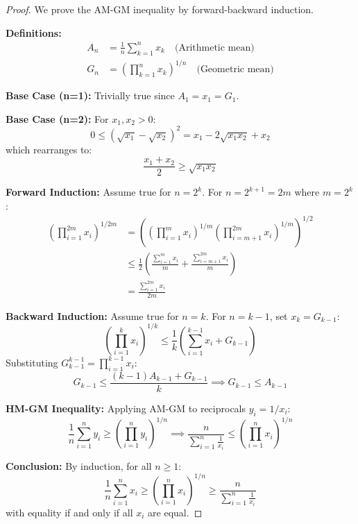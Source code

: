 \documentclass[12pt]{article}
\begin{document}
\begin{proof}
We prove the AM-GM inequality by forward-backward induction.

\vspace{0.5em}

\noindent \textbf{Definitions:}
\begin{align*}
A_n &= \frac{1}{n}\sum_{k=1}^n x_k \quad \text{(Arithmetic mean)} \\
G_n &= \left(\prod_{k=1}^n x_k\right)^{1/n} \quad \text{(Geometric mean)}
\end{align*}

\noindent \textbf{Base Case (n=1):} Trivially true since $A_1 = x_1 = G_1$.

\vspace{0.5em}

\noindent \textbf{Base Case (n=2):} For $x_1, x_2 > 0$:
\[
0 \leq (\sqrt{x_1} - \sqrt{x_2})^2 = x_1 - 2\sqrt{x_1x_2} + x_2
\]
which rearranges to:
\[
\frac{x_1 + x_2}{2} \geq \sqrt{x_1x_2}
\]

\vspace{0.5em}

\noindent \textbf{Forward Induction:} Assume true for $n=2^k$. For $n=2^{k+1}=2m$ where $m=2^k$:
\begin{align*}
\left(\prod_{i=1}^{2m} x_i\right)^{1/2m} &= \left(\left(\prod_{i=1}^m x_i\right)^{1/m} \left(\prod_{i=m+1}^{2m} x_i\right)^{1/m}\right)^{1/2} \\
&\leq \frac{1}{2}\left(\frac{\sum_{i=1}^m x_i}{m} + \frac{\sum_{i=m+1}^{2m} x_i}{m}\right) \\
&= \frac{\sum_{i=1}^{2m} x_i}{2m}
\end{align*}

\vspace{0.5em}

\noindent \textbf{Backward Induction:} Assume true for $n=k$. For $n=k-1$, set $x_k = G_{k-1}$:
\[
\left(\prod_{i=1}^k x_i\right)^{1/k} \leq \frac{1}{k}\left(\sum_{i=1}^{k-1} x_i + G_{k-1}\right)
\]
Substituting $G_{k-1}^{k-1} = \prod_{i=1}^{k-1} x_i$:
\[
G_{k-1} \leq \frac{(k-1)A_{k-1} + G_{k-1}}{k} \implies G_{k-1} \leq A_{k-1}
\]

\vspace{0.5em}

\noindent \textbf{HM-GM Inequality:} Applying AM-GM to reciprocals $y_i = 1/x_i$:
\[
\frac{1}{n}\sum_{i=1}^n y_i \geq \left(\prod_{i=1}^n y_i\right)^{1/n} \implies \frac{n}{\sum_{i=1}^n \frac{1}{x_i}} \leq \left(\prod_{i=1}^n x_i\right)^{1/n}
\]

\vspace{0.5em}

\noindent \textbf{Conclusion:} By induction, for all $n \geq 1$:
\[
\boxed{\frac{1}{n}\sum_{i=1}^n x_i \geq \left(\prod_{i=1}^n x_i\right)^{1/n} \geq \frac{n}{\sum_{i=1}^n \frac{1}{x_i}}}
\]
with equality if and only if all $x_i$ are equal.
\end{proof}
\end{document}
